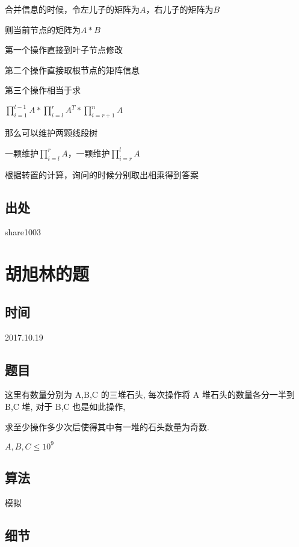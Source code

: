 \documentclass[a4paper]{article}
\begin{document}
		合并信息的时候，令左儿子的矩阵为$A$，右儿子的矩阵为$B$
		
		则当前节点的矩阵为$A*B$
		
		第一个操作直接到叶子节点修改
		
		第二个操作直接取根节点的矩阵信息
		
		第三个操作相当于求
		
		$\prod_{i = 1}^{l - 1} A * \prod_{i = l}^{r} A^T * \prod_{i = r + 1}^{n} A$
		
		那么可以维护两颗线段树
		
		一颗维护$\prod_{i = l}^{r}A$，一颗维护$\prod_{i = r}^{l}A$
		
		根据转置的计算，询问的时候分别取出相乘得到答案
		
	\subsection{出处}
	
		share1003
	
	\newpage
	
	\section{胡旭林的题}
		
	\subsection{时间}
		
		2017.10.19
		
	\subsection{题目}
		
		这里有数量分别为 A,B,C 的三堆石头, 每次操作将 A 堆石头的数量各分一半到 B,C 堆, 对于 B,C 也是如此操作,
		
		求至少操作多少次后使得其中有一堆的石头数量为奇数.
		
		$A,B,C \leq 10^9$
		
	\subsection{算法}
		
		模拟
		
	\subsection{细节}
		
\end{document}
